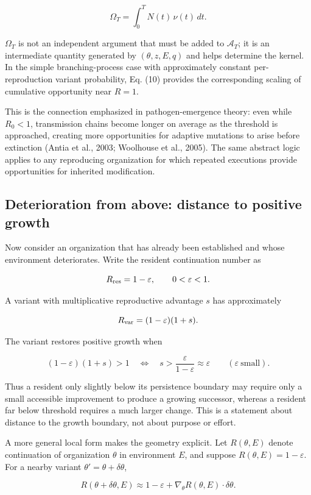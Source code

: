 \documentclass[11pt]{article}
\begin{document}
\[
\boxed{
\Omega_T = \int_0^T N(t)\,\nu(t)\,dt.
}
\tag{11}
\]

\(\Omega_T\) is not an independent argument that must be added to
\(\mathcal A_T\); it is an intermediate quantity generated by
\((\theta,z,E,q)\) and helps determine the kernel. In the simple
branching-process case with approximately constant per-reproduction
variant probability, Eq. (10) provides the corresponding scaling of
cumulative opportunity near \(R=1\).

This is the connection emphasized in pathogen-emergence theory: even
while \(R_0<1\), transmission chains become longer on average as the
threshold is approached, creating more opportunities for adaptive
mutations to arise before extinction (Antia et al., 2003; Woolhouse et
al., 2005). The same abstract logic applies to any reproducing
organization for which repeated executions provide opportunities for
inherited modification.

\subsection{Deterioration from above: distance to positive
growth}
Now consider an organization that has already been established and whose
environment deteriorates. Write the resident continuation number as

\[
R_{\rm res}=1-\varepsilon, \qquad 0<\varepsilon<1.
\]

A variant with multiplicative reproductive advantage \(s\) has
approximately

\[
R_{\rm var}=(1-\varepsilon)(1+s).
\]

The variant restores positive growth when

\[
(1-\varepsilon)(1+s)>1
\quad\Longleftrightarrow\quad
s>\frac{\varepsilon}{1-\varepsilon}
\approx \varepsilon
\qquad(\varepsilon\ \text{small}).
\tag{12}
\]

Thus a resident only slightly below its persistence boundary may require
only a small accessible improvement to produce a growing successor,
whereas a resident far below threshold requires a much larger change.
This is a statement about distance to the growth boundary, not about
purpose or effort.

A more general local form makes the geometry explicit. Let
\(R(\theta,E)\) denote continuation of organization \(\theta\) in
environment \(E\), and suppose \(R(\theta,E)=1-\varepsilon\). For a
nearby variant \(\theta'=\theta+\delta\theta\),

\[
R(\theta+\delta\theta,E)
\approx
1-\varepsilon
+
\nabla_\theta R(\theta,E)\cdot\delta\theta.
\]
\end{document}
